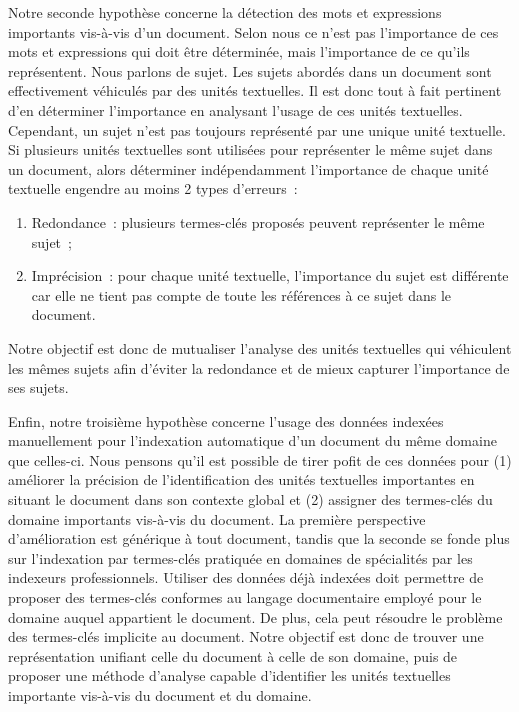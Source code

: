     Notre seconde hypothèse concerne la détection des mots et expressions
    importants vis-à-vis d'un document. Selon nous ce n'est pas l'importance de
    ces mots et expressions qui doit être déterminée, mais l'importance de ce
    qu'ils représentent. Nous parlons de sujet.
    Les sujets abordés dans un document sont effectivement véhiculés par des
    unités textuelles. Il est donc tout à fait pertinent d'en déterminer
    l'importance en analysant l'usage de ces unités textuelles. Cependant, un
    sujet n'est pas toujours représenté par une unique unité textuelle. Si
    plusieurs unités textuelles sont utilisées pour représenter le même sujet
    dans un document, alors déterminer indépendamment l'importance de chaque
    unité textuelle engendre au moins 2 types d'erreurs~:
    \begin{enumerate}
      \item{Redondance~: plusieurs termes-clés proposés peuvent représenter le
            même sujet~;}
      \item{Imprécision~: pour chaque unité textuelle, l'importance du sujet est
            différente car elle ne tient pas compte de toute les références à ce
            sujet dans le document.}
    \end{enumerate}
    Notre objectif est donc de mutualiser l'analyse des unités textuelles qui
    véhiculent les mêmes sujets afin d'éviter la redondance et de mieux capturer
    l'importance de ses sujets.
    
    Enfin, notre troisième hypothèse concerne l'usage des données indexées
    manuellement pour l'indexation automatique d'un document du même domaine que
    celles-ci. Nous pensons qu'il est possible de tirer pofit de ces données
    pour (1) améliorer la précision de l'identification des unités textuelles
    importantes en situant le document dans son contexte global et (2)
    assigner des termes-clés du domaine importants vis-à-vis du document.
    La première perspective d'amélioration est générique à tout document, tandis
    que la seconde se fonde plus sur l'indexation par termes-clés pratiquée en
    domaines de spécialités par les indexeurs professionnels. Utiliser des
    données déjà indexées doit permettre de proposer des termes-clés conformes
    au langage documentaire employé pour le domaine auquel appartient le
    document. De plus, cela peut résoudre le problème des termes-clés implicite
    au document.
    Notre objectif est donc de trouver une représentation unifiant celle du
    document à celle de son domaine, puis de proposer une méthode d'analyse
    capable d'identifier les unités textuelles importante vis-à-vis du document
    et du domaine.


